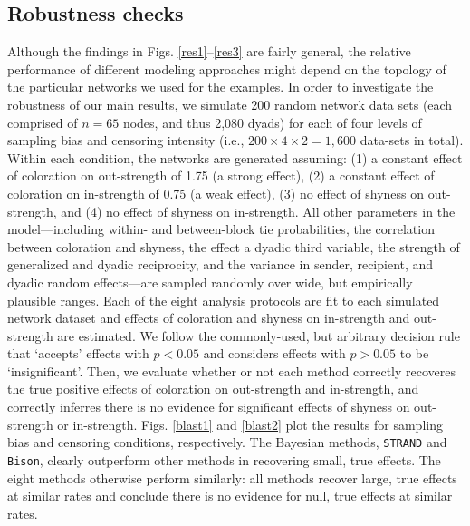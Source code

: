 \documentclass[Afour,sageh,times]{sagej}
\begin{document}
\subsection{Robustness checks}
Although the findings in Figs. \ref{res1}--\ref{res3} are fairly general, the relative performance of different modeling approaches might depend on the topology of the particular networks we used for the examples. In order to investigate the robustness of our main results, we simulate 200 random network data sets (each comprised of $n=65$ nodes, and thus 2,080 dyads) for each of four levels of sampling bias and censoring intensity (i.e., $200 \times 4 \times 2 = 1,600$ data-sets in total). Within each condition, the networks are generated assuming: (1) a constant effect of coloration on out-strength of 1.75 (a strong effect), (2) a constant effect of coloration on in-strength of 0.75 (a weak effect), (3) no effect of shyness on out-strength,  and (4) no effect of shyness on in-strength. All other parameters in the model---including within- and between-block tie probabilities, the correlation between coloration and shyness, the effect a dyadic third variable,  the strength of generalized and dyadic reciprocity, and the variance in sender, recipient, and dyadic random effects---are sampled randomly over wide, but empirically plausible ranges. Each of the eight analysis protocols are fit to each simulated network dataset and effects of coloration and shyness on in-strength and out-strength are estimated. We follow the commonly-used, but arbitrary decision rule that `accepts' effects with $p<0.05$ and considers effects with $p>0.05$ to be `insignificant'. Then, we evaluate whether or not each method correctly recoveres the true positive effects of coloration on out-strength and in-strength, and correctly inferres there is no evidence for significant effects of shyness on out-strength or in-strength. Figs. \ref{blast1} and \ref{blast2} plot the results for sampling bias and censoring conditions, respectively. The Bayesian methods, \texttt{STRAND} and \texttt{Bison}, clearly outperform other methods in recovering small, true effects. The eight methods otherwise perform similarly: all methods recover large, true effects at similar rates and conclude there is no evidence for null, true effects at similar rates.
\end{document}
